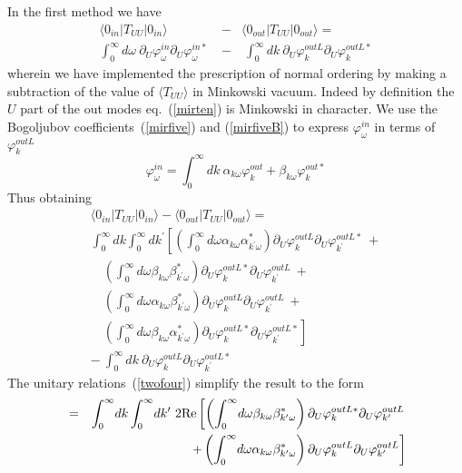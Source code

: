 \documentclass[12pt,oneside]{report}
\def\om{\omega	}
\def\p {\prime}
\begin{document}
\noindent In
the first method we have
\begin{eqnarray}
\langle 0_{in} \vert T_{UU} \vert 0_{in} \rangle &-& 
\langle 0_{out} \vert T_{UU} \vert 0_{out}\rangle
= \nonumber \\ 
\int_0^\infty\! d \omega \ \partial_U \varphi^{in}_\omega
\partial_U \varphi^{in *}_\omega \ &-& \ 
\int_0^\infty\! d k \ \partial_U \varphi^{out L}_k \partial_U
\varphi^{out L *}_k \label{TRBB}
\end{eqnarray}
wherein we have implemented the prescription of normal ordering
by making a subtraction of the value of $\langle T_{UU}
\rangle$ in Minkowski vacuum. Indeed by definition the $U$ part of the out modes
eq.~(\ref{mirten})  is Minkowski in character. We
 use the Bogoljubov coefficients~(\ref{mirfive}) and (\ref{mirfiveB}) to express
$\varphi^{in}_\om$ in terms of $\varphi^{out  L}_k$ 
\begin{equation}
\varphi^{in}_\om =\int_0^\infty\!dk\ 
\alpha_{k \om } \varphi^{out}_k +
\beta_{k \om } \varphi^{out *}_k
\label{TRB}\end{equation}
Thus obtaining \begin{eqnarray}
\langle 0_{in} \vert T_{UU} \vert 0_{in} \rangle -
\langle 0_{out} \vert T_{UU} \vert 0_{out}\rangle
= \nonumber\\
\int_0^\infty\!dk
\int_0^\infty \! dk^\p
\left[
\left(
\int_0^\infty\! d\om
\alpha_{k\om}\alpha^{*}_{k^\p\om}\right)
\partial_U \varphi^{out  L}_k \partial_U
\varphi^{out L *}_{k^\p} \right.\ +\nonumber\\
\quad \left(
\int_0^\infty\! d\om
\beta_{k\om}\beta^{*}_{k^\p\om}\right)
\partial_U \varphi^{out L *}_k \partial_U
\varphi^{out  L}_{k^\p}\ + \nonumber\\
\quad \left(
\int_0^\infty\! d\om
\alpha_{k\om}\beta^{*}_{k^\p\om}\right)
\partial_U \varphi^{out  L}_k \partial_U
\varphi^{out  L}_{k^\p}\ + \nonumber\\
\quad\left.\left(
\int_0^\infty\! d\om
\beta_{k\om}\alpha^{*}_{k^\p\om}\right)
\partial_U \varphi^{out L *}_k \partial_U
\varphi^{out L *}_{k^\p}\right]
\nonumber\\
-\ \int_0^\infty\! d k \ \partial_U 
\varphi^{out  L}_k \partial_U
\varphi^{out L *}_{k^\p}
\label{TRR}
\end{eqnarray}
The unitary
relations~(\ref{twofour}) simplify the result to the form
\begin{eqnarray}
&=& \int_0^\infty\!dk
\int_0^\infty \! dk^\p\ 
2 {\rm Re} \left[
\left(
\int_0^\infty\! d\om
\beta_{k\om}\beta^{*}_{k^\p\om}\right)
\partial_U\varphi_{k}^{out L *} \partial_U
\varphi_{k^\p}^{out  L} \right.
\nonumber\\
&\ & \quad 
\left. +
\left(
\int_0^\infty\! d\om
\alpha_{k\om}\beta^{*}_{k^\p\om}\right)
\partial_U\varphi_{k}^{out  L} \partial_U
\varphi_{k^\p}^{out  L} \right]
\label{TRRR}
\end{eqnarray}
\end{document}
